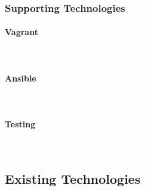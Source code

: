 \documentclass{article}
\begin{document}
\subsubsection{Supporting Technologies}
\paragraph{Vagrant}\mbox{}\\
\paragraph{Ansible}\mbox{}\\
\paragraph{Testing}\mbox{}\\

\subsection{Existing Technologies}
\end{document}
